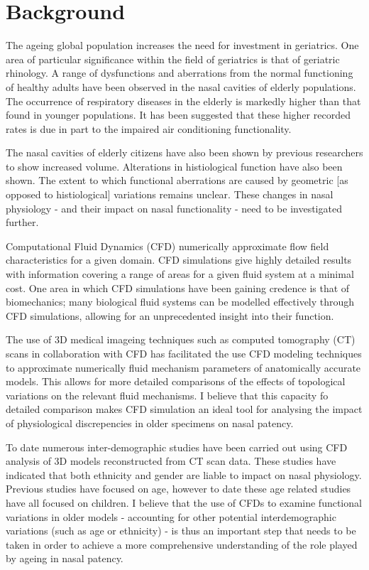 \section{Background}

The ageing global population increases the need for investment in geriatrics. One area of particular significance within the field of geriatrics is that of geriatric rhinology. A range of dysfunctions and aberrations from the normal functioning of healthy adults have been observed in the nasal cavities of elderly populations\cite{Edelstein1996, Lindemann2008}. The occurrence of respiratory diseases in the elderly is markedly higher than that found in younger populations\cite{HO2001, Edelstein1996}. It has been suggested that these higher recorded rates is due in part to the impaired air conditioning functionality\cite{Lindemann2008}.


The nasal cavities of elderly citizens have also been shown by previous researchers to show increased volume\cite{Kalmovich2005}. Alterations in histiological function have also been shown\cite{HO2001}. The extent to which functional aberrations are caused by geometric [as opposed to histiological] variations remains unclear\cite{Varga-Huettner2013}. These changes in nasal physiology - and their impact on nasal functionality - need to be investigated further.


Computational Fluid Dynamics (CFD) numerically approximate flow field characteristics for a given domain. CFD  simulations give highly detailed results with information covering a range of areas for a given fluid system at a minimal cost. One area in which CFD simulations have been gaining credence is that of biomechanics; many biological fluid systems can be modelled effectively through CFD simulations, allowing for an unprecedented insight into their function.

The use of 3D medical imageing techniques such as computed tomography (CT) scans in collaboration with CFD has facilitated the use CFD modeling techniques to approximate numerically fluid mechanism parameters of anatomically accurate models. This allows for more detailed comparisons of the effects of topological variations on the relevant fluid mechanisms. I believe that this capacity fo detailed comparison makes CFD simulation an ideal tool for analysing the impact of physiological discrepencies in older specimens on nasal patency.


To date numerous inter-demographic studies have been carried out using CFD analysis of 3D models reconstructed from CT scan data. These studies have indicated that both ethnicity and gender are liable to impact on nasal physiology. Previous studies have focused on age, however to date these age related studies have all focused on children. I believe that the use of CFDs to examine functional variations in older models - accounting for other potential interdemographic variations (such as age or ethnicity) - is thus an important step that needs to be taken in order to achieve a more comprehensive understanding of the role played by ageing in nasal patency.


